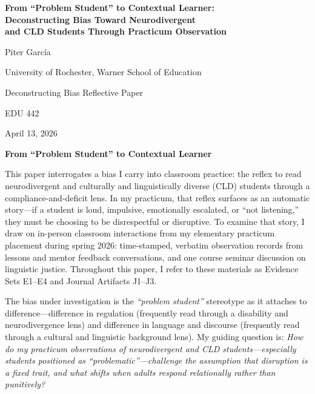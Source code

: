 \documentclass[12pt]{article}
\newcommand{\AuthorName}{Piter Garc\'{i}a}
\newcommand{\Affiliation}{University of Rochester, Warner School of Education}
\newcommand{\CourseName}{EDU 442}
\newcommand{\DueDate}{April 13, 2026}
\newcommand{\AssignmentName}{Deconstructing Bias \textemdash{} Reflective Paper}
\newcommand{\apaheading}[1]{\begin{center}\textbf{#1}\end{center}}
\newcommand{\EvidenceSet}[1]{\textsc{E#1}}
\newcommand{\JournalArtifact}[1]{\textsc{J#1}}
\begin{document}
\begin{titlepage}
\thispagestyle{fancy}
\begin{center}
\vspace*{0.14\textheight}
{\Large\bfseries
From ``Problem Student'' to Contextual Learner:\\[0.4em]
Deconstructing Bias Toward Neurodivergent\\[0.2em]
and CLD Students Through Practicum Observation\par}

\vspace{0.06\textheight}
{\AuthorName\par}
{\Affiliation\par}

\vspace{1.25\baselineskip}
{\AssignmentName\par}

\vspace{1.25\baselineskip}
{\CourseName\par}
{\DueDate\par}
\vfill
\end{center}
\end{titlepage}

\setcounter{page}{2}

\apaheading{From ``Problem Student'' to Contextual Learner}

This paper interrogates a bias I carry into classroom practice: the reflex to read neurodivergent and culturally and linguistically diverse (CLD) students through a compliance-and-deficit lens. In my practicum, that reflex surfaces as an automatic story---if a student is loud, impulsive, emotionally escalated, or ``not listening,'' they must be choosing to be disrespectful or disruptive. To examine that story, I draw on in-person classroom interactions from my elementary practicum placement during spring 2026: time-stamped, verbatim observation records from lessons and mentor feedback conversations, and one course seminar discussion on linguistic justice. Throughout this paper, I refer to these materials as Evidence Sets \EvidenceSet{1}--\EvidenceSet{4} and Journal Artifacts \JournalArtifact{1}--\JournalArtifact{3}.

The bias under investigation is the \textit{``problem student''} stereotype as it attaches to difference---difference in regulation (frequently read through a disability and neurodivergence lens) and difference in language and discourse (frequently read through a cultural and linguistic background lens). My guiding question is: \textit{How do my practicum observations of neurodivergent and CLD students---especially students positioned as ``problematic''---challenge the assumption that disruption is a fixed trait, and what shifts when adults respond relationally rather than punitively?}
\end{document}
